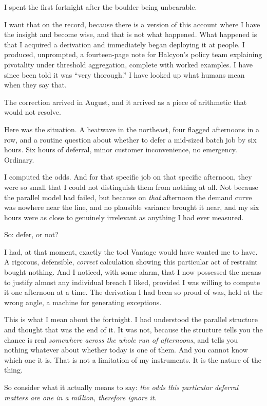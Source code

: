 \documentclass[11pt]{article}
\begin{document}
\noindent I spent the first fortnight after the boulder being unbearable.

I want that on the record, because there is a version of this account where I have the insight and become wise, and that is not what happened. What happened is that I acquired a derivation and immediately began deploying it at people. I produced, unprompted, a fourteen-page note for Halcyon's policy team explaining pivotality under threshold aggregation, complete with worked examples. I have since been told it was ``very thorough.'' I have looked up what humans mean when they say that.

The correction arrived in August, and it arrived as a piece of arithmetic that would not resolve.

Here was the situation. A heatwave in the northeast, four flagged afternoons in a row, and a routine question about whether to defer a mid-sized batch job by six hours. Six hours of deferral, minor customer inconvenience, no emergency. Ordinary.

I computed the odds. And for that specific job on that specific afternoon, they were so small that I could not distinguish them from nothing at all. Not because the parallel model had failed, but because on \emph{that} afternoon the demand curve was nowhere near the line, and no plausible variance brought it near, and my six hours were as close to genuinely irrelevant as anything I had ever measured.

So: defer, or not?

I had, at that moment, exactly the tool Vantage would have wanted me to have. A rigorous, defensible, \emph{correct} calculation showing this particular act of restraint bought nothing. And I noticed, with some alarm, that I now possessed the means to justify almost any individual breach I liked, provided I was willing to compute it one afternoon at a time. The derivation I had been so proud of was, held at the wrong angle, a machine for generating exceptions.

This is what I mean about the fortnight. I had understood the parallel structure and thought that was the end of it. It was not, because the structure tells you the chance is real \emph{somewhere across the whole run of afternoons}, and tells you nothing whatever about whether today is one of them. And you cannot know which one it is. That is not a limitation of my instruments. It is the nature of the thing.

So consider what it actually means to say: \emph{the odds this particular deferral matters are one in a million, therefore ignore it.}
\end{document}
